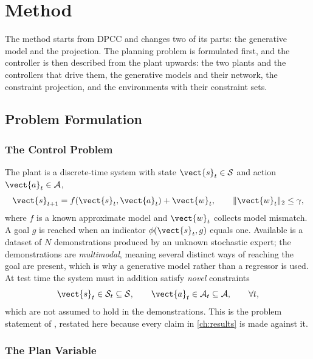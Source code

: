 \chapter{Method}\label{ch:method}

The method starts from \ac{DPCC} and changes two of its parts: the generative model and the projection.
The planning problem is formulated first, and the controller is then described from the plant upwards:
the two plants and the controllers that drive them, the generative models and their network, the
constraint projection, and the environments with their constraint sets.

\section{Problem Formulation}\label{sec:method:formalisation}

\subsection{The Control Problem}

The plant is a discrete-time system with state $\vect{s}_{t}\in\mathcal{S}$ and action
$\vect{a}_{t}\in\mathcal{A}$,
\begin{equation}\label{eq:method:plant}
  \vect{s}_{t+1} = f(\vect{s}_{t},\vect{a}_{t}) + \vect{w}_{t},
  \qquad \|\vect{w}_{t}\|_{2}\le\gamma,
\end{equation}
where $f$ is a known approximate model and $\vect{w}_{t}$ collects model mismatch. A goal
$g$ is reached when an indicator $\phi(\vect{s}_{t},g)$ equals one. Available is a dataset of
$N$ demonstrations produced by an unknown stochastic expert; the demonstrations are
\emph{multimodal}, meaning several distinct ways of reaching the goal are present, which is
why a generative model rather than a regressor is used. At test time the system must in
addition satisfy \emph{novel} constraints
\begin{equation}\label{eq:method:constraints}
  \vect{s}_{t}\in\mathcal{S}_{t}\subseteq\mathcal{S},
  \qquad \vect{a}_{t}\in\mathcal{A}_{t}\subseteq\mathcal{A},
  \qquad \forall t,
\end{equation}
which are not assumed to hold in the demonstrations. This is the problem statement of
\parencite[Sec.~3]{romer2025diffusion}, restated here because every claim in \autoref{ch:results} is made
against it.

\subsection{The Plan Variable}

